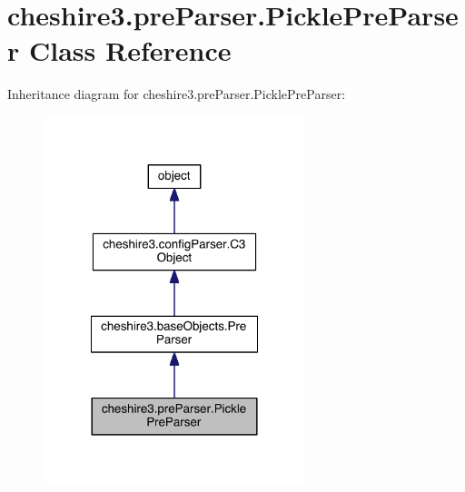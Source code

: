\hypertarget{classcheshire3_1_1pre_parser_1_1_pickle_pre_parser}{\section{cheshire3.\-pre\-Parser.\-Pickle\-Pre\-Parser Class Reference}
\label{classcheshire3_1_1pre_parser_1_1_pickle_pre_parser}
}


Inheritance diagram for cheshire3.\-pre\-Parser.\-Pickle\-Pre\-Parser\-:
\nopagebreak
\begin{figure}[H]
\begin{center}
\leavevmode
\includegraphics[width=216pt]{classcheshire3_1_1pre_parser_1_1_pickle_pre_parser__inherit__graph}
\end{center}
\end{figure}


